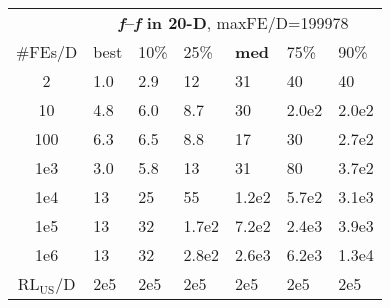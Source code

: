 \begin{tabular}{c|llllll}
 & \multicolumn{6}{|c}{\textbf{\textit{f}\raisebox{-0.35ex}{1}--\textit{f}\raisebox{-0.35ex}{24} in 20-D}, maxFE/D=199978}\\
\#FEs/D & best & 10\% & 25\% & \textbf{med} & 75\% & 90\%\\
2 & \hspace*{1ex}1.0 & \hspace*{1ex}2.9 & 12 & 31 & 40 & 40\\
10 & \hspace*{1ex}4.8 & \hspace*{1ex}6.0 & \hspace*{1ex}8.7 & 30 & 2.0e2 & 2.0e2\\
100 & \hspace*{1ex}6.3 & \hspace*{1ex}6.5 & \hspace*{1ex}8.8 & 17 & 30 & 2.7e2\\
1e3 & \hspace*{1ex}3.0 & \hspace*{1ex}5.8 & 13 & 31 & 80 & 3.7e2\\
1e4 & 13 & 25 & 55 & 1.2e2 & 5.7e2 & 3.1e3\\
1e5 & 13 & 32 & 1.7e2 & 7.2e2 & 2.4e3 & 3.9e3\\
1e6 & 13 & 32 & 2.8e2 & 2.6e3 & 6.2e3 & 1.3e4\\
$\text{RL}_{\text{US}}$/D & 2e5 & 2e5 & 2e5 & 2e5 & 2e5 & 2e5
\end{tabular}
